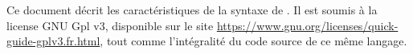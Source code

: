 \documentclass[../userguide]{subfiles}
\begin{document}
    Ce document décrit les caractéristiques de la syntaxe de \lang.
    Il est soumis à la license GNU Gpl v3, disponible sur le site
    \url{https://www.gnu.org/licenses/quick-guide-gplv3.fr.html}, tout comme l'intégralité du code source de
    ce même langage.
\end{document}
